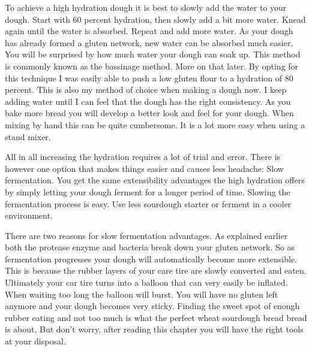 To achieve a high hydration dough it is best to slowly add the water to
your dough. Start with 60 percent hydration, then slowly add a bit more water. Knead
again until the water is absorbed. Repeat and add more water. As your dough
has already formed a gluten network, new water can be absorbed much easier.
You will be surprised by how much water your dough can soak up. This
method is commonly known as the bassinage method. More on that later.
By opting for this technique I was easily able to push a low
gluten flour to a hydration of 80 percent. This
is also my method of choice when making a dough now. I keep adding water until
I can feel that the dough has the right consistency. As you bake more bread
you will develop a better look and feel for your dough. When mixing
by hand this can be quite cumbersome. It is a lot more easy when using a stand
mixer.

All in all increasing the hydration requires a lot of trial and error. There
is however one option that makes things easier and causes less headache:
Slow fermentation. You get the same extensibility advantages the high hydration
offers by simply letting your dough ferment for a longer period of time.
Slowing the fermentation process is easy. Use less
sourdough starter or ferment in a cooler environment. 

There are two reasons for slow fermentation advantages.
As explained earlier both the protease enzyme and bacteria break down your
gluten network. So as fermentation progresses your dough will automatically
become more extensible. This is because the rubber layers of your care tire
are slowly converted and eaten. Ultimately your car tire turns into a balloon
that can very easily be inflated.  When waiting too long the
balloon will burst. You will have no gluten left anymore and your dough
becomes very sticky. Finding the sweet spot of enough rubber eating and not
too much is what the perfect wheat sourdough bread bread is about. But don't worry, after reading
this chapter you will have the right tools at your disposal.

